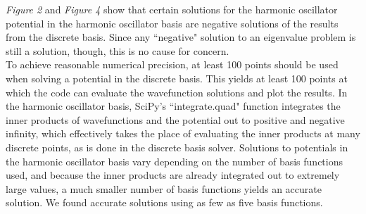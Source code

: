 \documentclass[%
 reprint,
 amsmath,amssymb,
 aps,
]{revtex4-1}
\begin{document}
\noindent \textit{Figure 2} and \textit{Figure 4} show that certain solutions for the harmonic oscillator potential in the harmonic oscillator basis are negative solutions of the results from the discrete basis.  Since any ``negative" solution to an eigenvalue problem is still a solution, though, this is no cause for concern.\\

\noindent To achieve reasonable numerical precision, at least 100 points should be used when solving a potential in the discrete basis.  This yields at least 100 points at which the code can evaluate the wavefunction solutions and plot the results.  In the harmonic oscillator basis, SciPy's ``integrate.quad" function integrates the inner products of wavefunctions and the potential out to positive and negative infinity, which effectively takes the place of evaluating the inner products at many discrete points, as is done in the discrete basis solver.  Solutions to potentials in the harmonic oscillator basis vary depending on the number of basis functions used, and because the inner products are already integrated out to extremely large values, a much smaller number of basis functions yields an accurate solution.  We found accurate solutions using as few as five basis functions.\\
\end{document}
